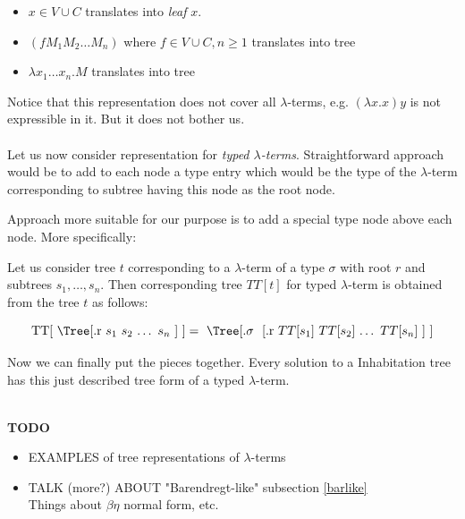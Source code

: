 \documentclass[12pt,a4paper]{report}
\newcommand{\Lets}{Let us }
\newcommand{\lterm}{$\lambda$-term\xspace}
\newcommand{\lterms}{$\lambda$-terms\xspace}
\begin{document}
\begin{itemize}
    \item $x \in V \cup C$ translates into \textit{leaf} $x$.
	\item $(f M_1 M_2 \dots M_n)$ where $f \in V \cup C, n \geq 1$ translates into tree\\
	\item $\lambda x_1 \dots x_n . M$ translates into tree\\
\end{itemize}

Notice that this representation does not cover all \lterms, 
e.g. $(\lambda x.x) y$ is not expressible in it. But it does not bother us.  
\\\\
\Lets now consider representation for \textit{typed \lterms}.
Straightforward approach would be to add to each node a type entry which 
would be the type of the \lterm corresponding to subtree having this
node as the root node. 

Approach more suitable for our purpose is to add a special type node above each node.
More specifically:

\Lets consider tree $t$ corresponding to a \lterm of a type
$\sigma$ with root $r$ and subtrees $s_1 , \dots , s_n$. 
Then corresponding tree $TT[t]$ for typed \lterm is 
obtained from the tree $t$ as follows:  

\begin{equation*}
\mbox{ 
TT[
\Tree
	[.r 	
	  	  \text{$s_1$}
		  \text{$s_2$}
		  \text{$\dots$}
		  \text{$s_n$}
	] 
}]=
\mbox{
\Tree
	[.\text{$\sigma$ }
	    [.r 	
	  	  \text{$TT[s_1]$}
		  \text{$TT[s_2]$}
		  \text{$\dots$}
		  \text{$TT[s_n]$}
		]	  	
	] 
}
\end{equation*}
	  	
Now we can finally put the pieces together. 
Every solution to a Inhabitation tree has this just described tree form of a typed \lterm. 
 

~\\
\textbf{TODO} 
\begin{itemize}
\item EXAMPLES of tree representations of \lterms  
\item TALK (more?) ABOUT "Barendregt-like" subsection \ref{barlike}\\
		Things about $\beta\eta$ normal form, etc.    
\end{itemize}
		
\end{document}
